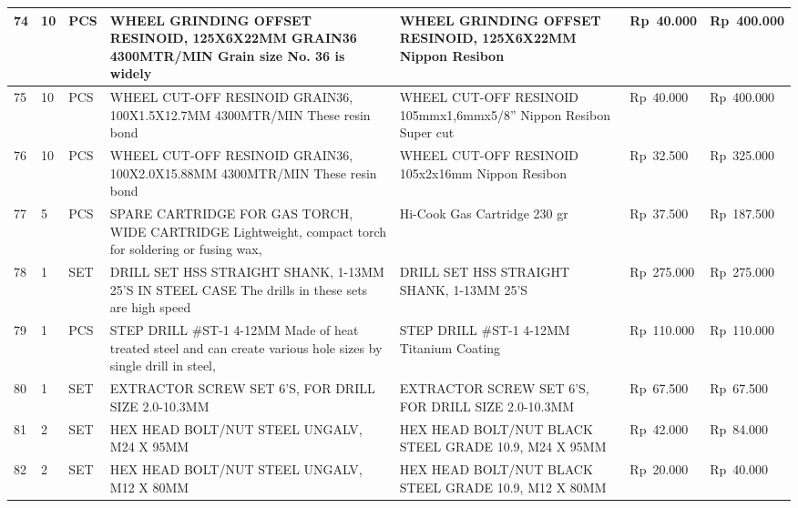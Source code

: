 \documentclass[9pt,a4paper,landscape]{article}
\begin{document}
\begin{longtable}{|C{0.6cm}|C{0.6cm}|C{0.8cm}|L{8.0cm}|L{9.5cm}|R{2.5cm}|R{2.5cm}|}
74 & 10 & PCS &
  WHEEL GRINDING OFFSET RESINOID, 125X6X22MM\newline
  GRAIN36 4300MTR/MIN Grain size No. 36 is widely &
  WHEEL GRINDING OFFSET RESINOID, 125X6X22MM Nippon Resibon &
  Rp~40.000 & Rp~400.000 \\
\hline

75 & 10 & PCS &
  WHEEL CUT-OFF RESINOID GRAIN36,\newline
  100X1.5X12.7MM 4300MTR/MIN These resin bond &
  WHEEL CUT-OFF RESINOID 105mmx1,6mmx5/8'' Nippon Resibon Super cut &
  Rp~40.000 & Rp~400.000 \\
\hline

76 & 10 & PCS &
  WHEEL CUT-OFF RESINOID GRAIN36,\newline
  100X2.0X15.88MM 4300MTR/MIN These resin bond &
  WHEEL CUT-OFF RESINOID 105x2x16mm Nippon Resibon &
  Rp~32.500 & Rp~325.000 \\
\hline

77 & 5 & PCS &
  SPARE CARTRIDGE FOR GAS TORCH, WIDE CARTRIDGE\newline
  Lightweight, compact torch for soldering or fusing wax, &
  Hi-Cook Gas Cartridge 230 gr &
  Rp~37.500 & Rp~187.500 \\
\hline

78 & 1 & SET &
  DRILL SET HSS STRAIGHT SHANK, 1-13MM 25'S IN\newline
  STEEL CASE The drills in these sets are high speed &
  DRILL SET HSS STRAIGHT SHANK, 1-13MM 25'S &
  Rp~275.000 & Rp~275.000 \\
\hline

79 & 1 & PCS &
  STEP DRILL \#ST-1 4-12MM\newline
  Made of heat treated steel and can create various\newline
  hole sizes by single drill in steel, &
  STEP DRILL \#ST-1 4-12MM Titanium Coating &
  Rp~110.000 & Rp~110.000 \\
\hline

80 & 1 & SET &
  EXTRACTOR SCREW SET 6'S,\newline
  FOR DRILL SIZE 2.0-10.3MM &
  EXTRACTOR SCREW SET 6'S, FOR DRILL SIZE 2.0-10.3MM &
  Rp~67.500 & Rp~67.500 \\
\hline

81 & 2 & SET &
  HEX HEAD BOLT/NUT STEEL UNGALV, M24 X 95MM &
  HEX HEAD BOLT/NUT BLACK STEEL GRADE 10.9, M24 X 95MM &
  Rp~42.000 & Rp~84.000 \\
\hline

82 & 2 & SET &
  HEX HEAD BOLT/NUT STEEL UNGALV, M12 X 80MM &
  HEX HEAD BOLT/NUT BLACK STEEL GRADE 10.9, M12 X 80MM &
  Rp~20.000 & Rp~40.000 \\
\hline


\end{longtable}
\end{document}
